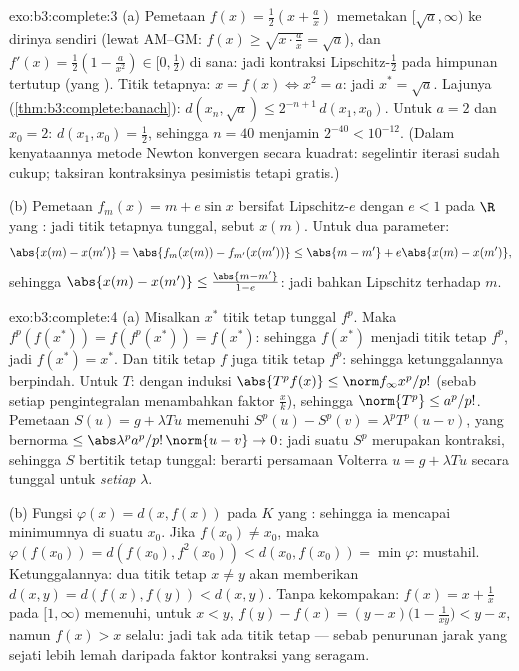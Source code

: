 \begin{solution}{exo:b3:complete:3}
(a) Pemetaan $f(x) = \frac12(x + \frac ax)$ memetakan $[\sqrt a, \infty)$ ke
dirinya sendiri (lewat AM--GM: $f(x) \geq \sqrt{x \cdot \frac ax} = \sqrt a$),
dan $f'(x) = \frac12(1 - \frac a{x^2}) \in [0, \frac12)$ di sana:
jadi kontraksi Lipschitz-$\frac12$ pada himpunan tertutup (yang ).
Titik tetapnya: $x = f(x) \iff x^2 = a$: jadi $x^* = \sqrt a$. Lajunya
(\cref{thm:b3:complete:banach}): $d(x_n, \sqrt a) \leq
2^{-n+1}\,d(x_1, x_0)$. Untuk $a = 2$ dan $x_0 = 2$: $d(x_1, x_0) =
\frac12$, sehingga $n = 40$ menjamin $2^{-40} < 10^{-12}$. (Dalam
kenyataannya metode Newton konvergen secara kuadrat: segelintir
iterasi sudah cukup; taksiran kontraksinya pesimistis tetapi
gratis.)

(b) Pemetaan $f_m(x) = m + e\sin x$ bersifat Lipschitz-$e$ dengan $e < 1$ pada
$\R$ yang : jadi titik tetapnya tunggal, sebut $x(m)$. Untuk dua parameter:
\[
\abs{x(m) - x(m')} = \abs{f_m(x(m)) - f_{m'}(x(m'))}
\leq \abs{m - m'} + e\abs{x(m) - x(m')},
\]
sehingga $\abs{x(m) - x(m')} \leq \frac{\abs{m - m'}}{1 - e}$: jadi bahkan
Lipschitz terhadap $m$.
\end{solution}

\begin{solution}{exo:b3:complete:4}
(a) Misalkan $x^*$ titik tetap tunggal $f^p$. Maka
$f^p(f(x^*)) = f(f^p(x^*)) = f(x^*)$: sehingga $f(x^*)$ menjadi titik tetap
$f^p$, jadi $f(x^*) = x^*$. Dan titik tetap $f$ juga titik tetap
$f^p$: sehingga ketunggalannya berpindah. Untuk $T$: dengan induksi $\abs{T^pf(x)}
\leq \norm f_\infty x^p/p!$ (sebab setiap pengintegralan menambahkan faktor
$\frac xk$), sehingga $\norm{T^p} \leq a^p/p!$. Pemetaan $S(u) = g +
\lambda Tu$ memenuhi $S^p(u) - S^p(v) = \lambda^pT^p(u - v)$,
yang bernorma $\leq \abs\lambda^pa^p/p!\,\norm{u - v} \to 0$: jadi suatu
$S^p$ merupakan kontraksi, sehingga $S$ bertitik tetap tunggal: berarti
persamaan Volterra $u = g + \lambda Tu$  secara tunggal untuk
\emph{setiap} $\lambda$.

(b) Fungsi $\varphi(x) = d(x, f(x))$  pada $K$ yang :
sehingga ia mencapai minimumnya di suatu $x_0$. Jika $f(x_0) \neq x_0$,
maka $\varphi(f(x_0)) = d(f(x_0), f^2(x_0)) < d(x_0, f(x_0)) =
\min\varphi$: mustahil. Ketunggalannya: dua titik tetap $x \ne y$
akan memberikan $d(x,y) = d(f(x), f(y)) < d(x,y)$. Tanpa
kekompakan: $f(x) = x + \frac1x$ pada $[1, \infty)$ memenuhi,
untuk $x < y$, $f(y) - f(x) = (y - x)\bigl(1 - \frac1{xy}\bigr) <
y - x$, namun $f(x) > x$ selalu: jadi tak ada titik tetap --- sebab penurunan
jarak yang sejati lebih lemah daripada faktor kontraksi yang seragam.
\end{solution}


